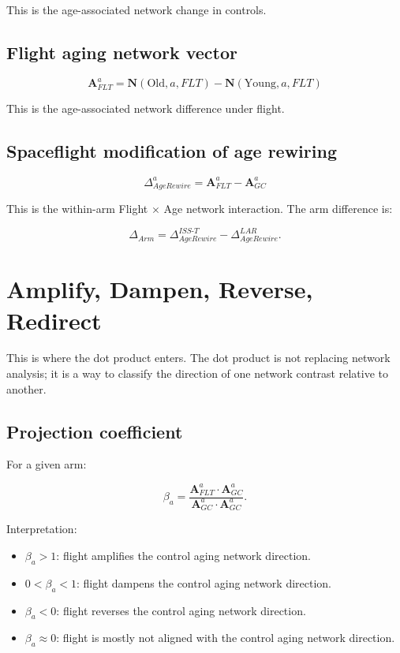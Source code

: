 \documentclass[11pt]{article}
\begin{document}
This is the age-associated network change in controls.

\subsection{Flight aging network vector}

\[
\mathbf{A}^{a}_{FLT}
= \mathbf{N}(\mathrm{Old}, a, FLT)
- \mathbf{N}(\mathrm{Young}, a, FLT)
\]

This is the age-associated network difference under flight.

\subsection{Spaceflight modification of age rewiring}

\[
\Delta^{a}_{AgeRewire}
= \mathbf{A}^{a}_{FLT} - \mathbf{A}^{a}_{GC}
\]

This is the within-arm Flight $\times$ Age network interaction. The arm
difference is:

\[
\Delta_{Arm}
= \Delta^{ISS\mbox{-}T}_{AgeRewire}
- \Delta^{LAR}_{AgeRewire}.
\]

\section{Amplify, Dampen, Reverse, Redirect}

This is where the dot product enters. The dot product is not replacing network
analysis; it is a way to classify the direction of one network contrast relative
to another.

\subsection{Projection coefficient}

For a given arm:

\[
\beta_a =
\frac{\mathbf{A}^{a}_{FLT} \cdot \mathbf{A}^{a}_{GC}}
     {\mathbf{A}^{a}_{GC} \cdot \mathbf{A}^{a}_{GC}}.
\]

Interpretation:

\begin{itemize}
  \item $\beta_a > 1$: flight amplifies the control aging network direction.
  \item $0 < \beta_a < 1$: flight dampens the control aging network direction.
  \item $\beta_a < 0$: flight reverses the control aging network direction.
  \item $\beta_a \approx 0$: flight is mostly not aligned with the control aging
        network direction.
\end{itemize}
\end{document}
